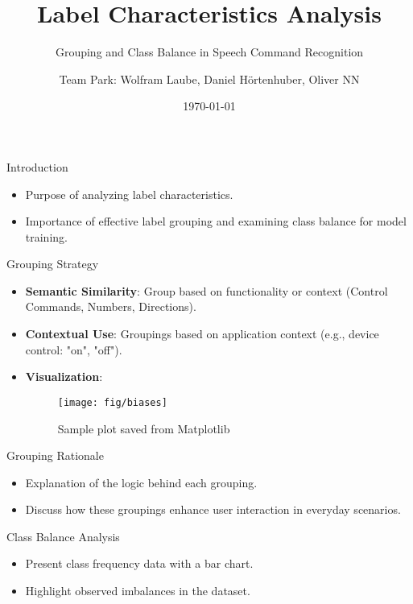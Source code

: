 \documentclass{beamer}
\title{Label Characteristics Analysis}
\subtitle{Grouping and Class Balance in Speech Command Recognition}
\author{Team Park: Wolfram Laube, Daniel Hörtenhuber, Oliver NN}
\institute{JKU \\ MLPC}
\date{\today}
\begin{document}
\begin{frame}
  \titlepage
\end{frame}

\begin{frame}{Introduction}
  \begin{itemize}
    \item Purpose of analyzing label characteristics.
    \item Importance of effective label grouping and examining class balance for model training.
  \end{itemize}
\end{frame}

\begin{frame}{Grouping Strategy}
  \begin{itemize}
    \item \textbf{Semantic Similarity}: Group based on functionality or context (Control Commands, Numbers, Directions).
    \item \textbf{Contextual Use}: Groupings based on application context (e.g., device control: "on", "off").
    \item \textbf{Visualization}:
      \begin{figure}
        \centering
        \texttt{[image: fig/biases]}
        \caption{Sample plot saved from Matplotlib}
        \label{fig:figure}
      \end{figure}

  \end{itemize}
\end{frame}

\begin{frame}{Grouping Rationale}
  \begin{itemize}
    \item Explanation of the logic behind each grouping.
    \item Discuss how these groupings enhance user interaction in everyday scenarios.
  \end{itemize}
\end{frame}

\begin{frame}{Class Balance Analysis}
  \begin{itemize}
    \item Present class frequency data with a bar chart.
    \item Highlight observed imbalances in the dataset.
  \end{itemize}
\end{frame}
\end{document}

